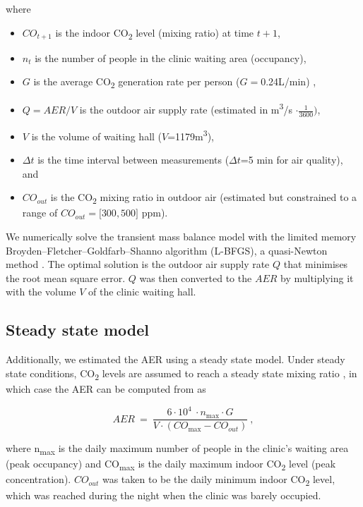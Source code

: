 \documentclass[11pt]{article}
\begin{document}
where

\begin{itemize}
\item
\(CO_{t + 1}\) is the indoor CO\textsubscript{2} level (mixing ratio) at time \(t + 1\),
\item
\(n_{t}\) is the number of people in the clinic waiting area (occupancy),
\item
\(G\) is the average CO\textsubscript{2} generation rate per person (\(G =\)0.24L/min) \cite{persily2017IndoorAir},
\item
\(Q = AER/V\) is the outdoor air supply rate (estimated in m\textsuperscript{3}/s \(\cdot \frac{1}{3600})\),
\item
\(V\) is the volume of waiting hall (\(V\)=1179m\textsuperscript{3}),
\item
\(\Delta t\) is the time interval between measurements (\(\Delta t\)=5 min for air quality), and
\item
\(CO_{out}\) is the CO\textsubscript{2} mixing ratio in outdoor air (estimated but constrained to a range of \(CO_{out} = \lbrack 300,500\rbrack\) ppm).
\end{itemize}

We numerically solve the transient mass balance model with the limited memory Broyden--Fletcher--Goldfarb--Shanno algorithm (L-BFGS), a quasi-Newton method \cite{byrd1995SIAMJSciComput}. The optimal solution is the outdoor air supply rate \(Q\) that minimises the root mean square error. \(Q\) was then converted to the \(AER\) by multiplying it with the volume \(V\) of the clinic waiting hall.

\subsection{Steady state model}\label{steady-state-model}

Additionally, we estimated the AER using a steady state model. Under steady state conditions, CO\textsubscript{2} levels are assumed to reach a steady state mixing ratio \cite{batterman2017IntJEnvResPublicHealth}, in which case the AER can be computed from as

\[AER\  = \ \frac{6 \cdot 10^{4}\  \cdot n_{\max} \cdot G}{V \cdot (CO_{\max} - CO_{out})}~,\]

where n\textsubscript{max} is the daily maximum number of people in the clinic's waiting area (peak occupancy) and CO\textsubscript{max} is the daily maximum indoor CO\textsubscript{2} level (peak concentration). \(CO_{out}\) was taken to be the daily minimum indoor CO\textsubscript{2} level, which was reached during the night when the clinic was barely occupied. 
\end{document}
